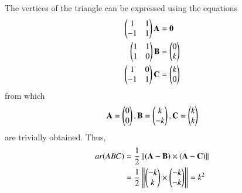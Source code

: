 The vertices of the triangle can be expressed using the equations
\begin{align}
	\myvec{1&1\\-1&1} \vec{A} &= \vec{0}
	\\
	\myvec{1&1\\1&0} \vec{B} &= \myvec{0\\k}
	\\
	\myvec{1&0\\-1&1} \vec{C} &= \myvec{k\\0}
\end{align}
from which
\begin{align}
\vec{A} = \myvec{0\\0},
	\vec{B}=\myvec{k\\-k},
	\vec{C}=\myvec{k\\k}
\end{align}
are trivially obtained.
Thus, 
\begin{align}
ar(ABC) &=\frac{1}{2}\norm{(\vec{A}-\vec{B})\times(\vec{A}-\vec{C})}\\
	&=\frac{1}{2}\norm{\myvec{-k\\k}\times\myvec{-k\\-k}}
=k^2
\end{align}
